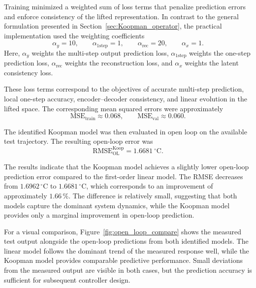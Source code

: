 Training minimized a weighted sum of loss terms that penalize prediction errors and enforce consistency of the lifted representation. In contrast to the general formulation presented in Section~\ref{sec:Koopman_operator}, the practical implementation used the weighting coefficients
\begin{equation}
\alpha_y = 10, \qquad
\alpha_{\mathrm{1step}} = 1, \qquad
\alpha_{\mathrm{rec}} = 20, \qquad
\alpha_x = 1.
\label{eq:koopman_loss_weights}
\end{equation}
Here, $\alpha_y$ weights the multi-step output prediction loss, $\alpha_{\mathrm{1step}}$ weights the one-step prediction loss, $\alpha_{\mathrm{rec}}$ weights the reconstruction loss, and $\alpha_x$ weights the latent consistency loss.

These loss terms correspond to the objectives of accurate multi-step prediction, local one-step accuracy, encoder--decoder consistency, and linear evolution in the lifted space. The corresponding mean squared errors were approximately
\begin{equation}
\mathrm{MSE}_{\mathrm{train}} \approx 0.068, \qquad
\mathrm{MSE}_{\mathrm{val}} \approx 0.060.
\label{eq:koopman_train_val_mse}
\end{equation}


The identified Koopman model was then evaluated in open loop on the available test trajectory. The resulting open-loop error was
\begin{equation}
\mathrm{RMSE}_{\mathrm{OL}}^{\mathrm{Koop}} = 1.6681~^{\circ}\mathrm{C}.
\label{eq:koopman_rmseOL}
\end{equation}

The results indicate that the Koopman model achieves a slightly lower open-loop prediction error compared to the first-order linear model. The RMSE decreases from $1.6962\,^\circ\mathrm{C}$ to $1.6681\,^\circ\mathrm{C}$, which corresponds to an improvement of approximately $1.66\,\%$. The difference is relatively small, suggesting that both models capture the dominant system dynamics, while the Koopman model provides only a marginal improvement in open-loop prediction.


For a visual comparison, Figure~\ref{fig:open_loop_compare} shows the measured test output alongside the open-loop predictions from both identified models. The linear model follows the dominant trend of the measured response well, while the Koopman model provides comparable predictive performance. Small deviations from the measured output are visible in both cases, but the prediction accuracy is sufficient for subsequent controller design.

